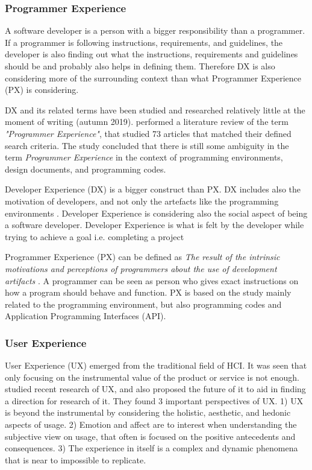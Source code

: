 \documentclass[english, 12pt, a4paper, sci, utf8, a-1b, online]{aaltothesis}
\newcommand{\now}{autumn 2019}
\begin{document}
\subsubsection{Programmer Experience}

A software developer is a person with a bigger responsibility than a programmer. If a programmer is following instructions, requirements, and guidelines, the developer is also finding out what the instructions, requirements and guidelines should be and probably also helps in defining them. Therefore DX is also considering more of the surrounding context than what Programmer Experience (PX) is considering.

DX and its related terms have been studied and researched relatively little at the moment of writing (\now). \textcite{programmer-experience} performed a literature review of the term \textit{"Programmer Experience"}, that studied 73 articles that matched their defined search criteria. The study concluded that there is still some ambiguity in the term \textit{Programmer Experience} in the context of programming environments, design documents, and programming codes.

Developer Experience (DX) is a bigger construct than PX. DX includes also the motivation of developers, and not only the artefacts like the programming environments \parencite{programmer-experience}. Developer Experience is considering also the social aspect of being a software developer. Developer Experience is what is felt by the developer while trying to achieve a goal i.e. completing a project

Programmer Experience (PX) can be defined as \textit{The result of the intrinsic motivations and perceptions of programmers about the use of development artifacts} \parencite{programmer-experience}. A programmer can be seen as person who gives exact instructions on how a program should behave and function. PX is based on the study mainly related to the programming environment, but also programming codes and Application Programming Interfaces (API).


\subsubsection{User Experience} \label{section:ux}

User Experience (UX) emerged from the traditional field of HCI. It was seen that only focusing on the instrumental value of the product or service is not enough. \textcite{ux-research-agenda} studied recent research of UX, and also proposed the future of it to aid in finding a direction for research of it. They found 3 important perspectives of UX. 1) UX is beyond the instrumental by considering the holistic, aesthetic, and hedonic aspects of usage. 2) Emotion and affect are to interest when understanding the subjective view on usage, that often is focused on the positive antecedents and consequences. 3) The experience in itself is a complex and dynamic phenomena that is near to impossible to replicate.
\end{document}
